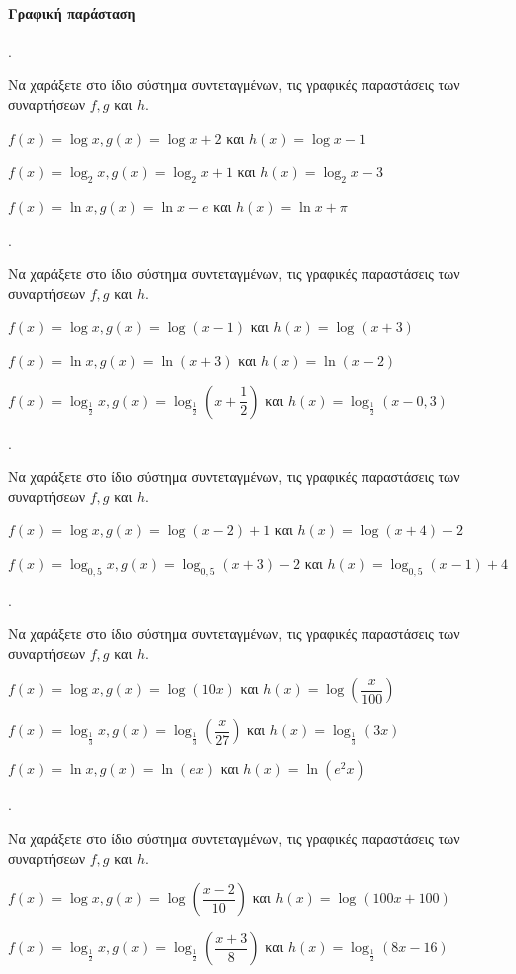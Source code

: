 \documentclass[11pt,a4paper,twocolumn]{article}
\newcounter{askhsh}
\newcommand{\askhsh}{\large\theaskhsh.\ \addtocounter{askhsh}{1}}
\begin{document}
\paragraph{Γραφική παράσταση}
\askhsh Να χαράξετε στο ίδιο σύστημα συντεταγμένων, τις γραφικές παραστάσεις των συναρτήσεων $f,g$ και $h$.
\begin{alist}[leftmargin=4mm]
\item $f(x)=\log{x},g(x)=\log{x}+2$ και $h(x)=\log{x}-1$
\item $f(x)=\log_2{x},g(x)=\log_2{x}+1$ και $h(x)=\log_2{x}-3$
\item $f(x)=\ln{x},g(x)=\ln{x}-e$ και $h(x)=\ln{x}+\pi$
\end{alist}
\askhsh Να χαράξετε στο ίδιο σύστημα συντεταγμένων, τις γραφικές παραστάσεις των συναρτήσεων $f,g$ και $h$.
\begin{alist}
\item $f(x)=\log{x},g(x)=\log{(x-1)}$ και $h(x)=\log{(x+3)}$
\item $f(x)=\ln{x},g(x)=\ln{(x+3)}$ και $h(x)=\ln{(x-2)}$
\item $f(x)=\log_{\frac{1}{2}}{x},g(x)=\log_{\frac{1}{2}}{\left(x+\dfrac{1}{2}\right)}$ και $h(x)=\log_{\frac{1}{2}}{(x-0{,}3)}$
\end{alist}
\askhsh Να χαράξετε στο ίδιο σύστημα συντεταγμένων, τις γραφικές παραστάσεις των συναρτήσεων $f,g$ και $h$.
\begin{alist}
\item $f(x)=\log{x},g(x)=\log{(x-2)+1}$ και $h(x)=\log{(x+4)-2}$
\item $f(x)=\log_{0{,}5}{x},g(x)=\log_{0{,}5}{(x+3)}-2$ και $h(x)=\log_{0{,}5}{(x-1)+4}$
\end{alist}
\askhsh Να χαράξετε στο ίδιο σύστημα συντεταγμένων, τις γραφικές παραστάσεις των συναρτήσεων $f,g$ και $h$.
\begin{alist}
\item $f(x)=\log{x},g(x)=\log{(10x)}$ και $h(x)=\log{\left(\dfrac{x}{100}\right)}$
\item $f(x)=\log_{\frac{1}{3}}{x},g(x)=\log_{\frac{1}{3}}{\left(\dfrac{x}{27}\right)}$ και $h(x)=\log_{\frac{1}{3}}{(3x)}$
\item $f(x)=\ln{x},g(x)=\ln{(ex)}$ και $h(x)=\ln{(e^2x)}$
\end{alist}
\askhsh Να χαράξετε στο ίδιο σύστημα συντεταγμένων, τις γραφικές παραστάσεις των συναρτήσεων $f,g$ και $h$.
\begin{alist}
\item $f(x)=\log{x},g(x)=\log{\left(\dfrac{x-2}{10}\right)}$ και $h(x)=\log{\left(100x+100\right)}$
\item $f(x)=\log_{\frac{1}{2}}{x},g(x)=\log_{\frac{1}{2}}{\left(\dfrac{x+3}{8}\right)}$ και $h(x)=\log_{\frac{1}{2}}{(8x-16)}$
\end{alist}
\end{document}
